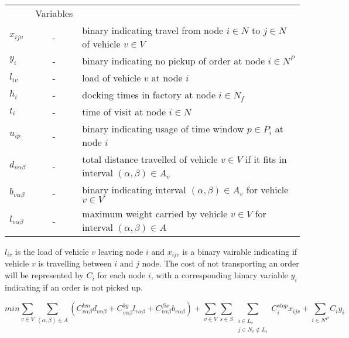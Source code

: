 \documentclass[a4paper,10pt]{article}
\begin{document}
\begin{tabular} {l c l}
    			&Variables										\\
	$x_{ijv}$	&-& 	binary indicating travel from node $i\in N$ to $j\in N$ of vehicle $v\in V$	\\
    	$y_i    $ 	&-& 	binary indicating no pickup of order at node $i\in N^P$				\\
	$l_{iv}	$	&-&	load of vehicle $v$ at node $i$							\\ 
	$h_i	$	&-&	docking times in factory at node $i\in N_f$					\\
	$t_i 	$	&-&	time of visit at node $i\in N$							\\
	$u_{ip}	$	&-&	binary indicating usage of time window $p\in P_i$ at node $i$			\\
        $d_{v\alpha\beta} $	&-& 	total distance travelled of vehicle $v\in V$ if it fits in interval $(\alpha, \beta) \in A_v$	\\
        $b_{v\alpha\beta} $	&-&	binary indicating interval $(\alpha, \beta) \in A_v$ for vehicle $v\in V$		\\
        $l_{v\alpha\beta}$ &-&	maximum weight carried by vehicle $v \in V$ for interval $(\alpha,\beta) \in A$			\\

\end{tabular}
\linebreak
\linebreak
\par

$l_{iv}$ is the load of vehicle $v$ leaving node $i$ and $x_{ijv}$ is a binary vairable indicating if vehicle $v$ is travelling between $i$ and $j$ node. 
The cost of not transporting an order will be represented by $C_i$ for each node $i$, with a corresponding binary variable $y_i$ indicating if an order is not picked up.

\begin{equation}
\label{eq:1}
	min\sum_{v\in V} \sum_{(\alpha, \beta) \in A} ( C^{km}_{v\alpha\beta}d_{v\alpha\beta} + C^{kg}_{v\alpha\beta}l_{v\alpha\beta} + C^{fix}_{v\alpha\beta}b_{v\alpha\beta} ) + \sum_{v\in V}\sum_{s\in S}\sum_{\substack{i \in L_s\\j \in N_v{\notin} L_s}}C^{stop}_ix_{ijv} + \sum_{i\in N^P}C_iy_i
\end{equation}
\end{document}

